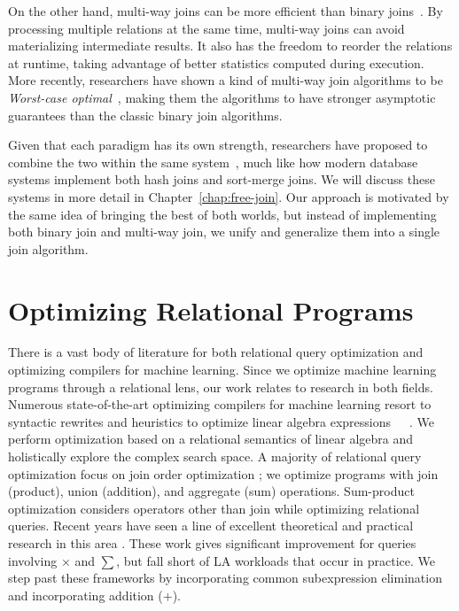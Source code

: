 On the other hand, multi-way joins can be more efficient than binary joins~\cite{DBLP:conf/vldb/GraefeBC98, DBLP:conf/vldb/KemperKW99, DBLP:conf/sigmod/HellersteinA00}.
By processing multiple relations at the same time, 
 multi-way joins can avoid materializing intermediate results. 
It also has the freedom to reorder the relations at runtime,
 taking advantage of better statistics computed during execution.
More recently, researchers have shown a kind of multi-way join algorithms to be 
 {\em Worst-case optimal}~\cite{DBLP:conf/pods/NgoPRR12, DBLP:conf/icdt/Veldhuizen14,
  DBLP:journals/sigmod/NgoRR13, DBLP:conf/pods/000118},
 making them the algorithms to have stronger asymptotic guarantees than the classic binary join algorithms.

Given that each paradigm has its own strength, 
 researchers have proposed to combine the two within the same 
 system~\cite{DBLP:journals/pvldb/FreitagBSKN20,DBLP:journals/tods/AbergerLTNOR17, DBLP:journals/pvldb/MhedhbiS19}, 
 much like how modern database systems implement both hash joins and sort-merge joins.
We will discuss these systems in more detail in Chapter~\ref{chap:free-join}.
Our approach is motivated by the same idea of bringing the best of both worlds, 
 but instead of implementing both binary join and multi-way join,
 we unify and generalize them into a single join algorithm.

\section{Optimizing Relational Programs}
\label{sec:related:linear-algebra}

There is a vast body of literature for both relational query optimization and
optimizing compilers for machine learning. Since we optimize machine learning programs through a
relational lens, our work relates to research in both fields. 
Numerous state-of-the-art optimizing compilers for machine learning
 resort to syntactic rewrites and heuristics to optimize linear algebra
expressions~\cite{DBLP:reference/bdt/Boehm19}~\cite{DBLP:conf/icml/SujeethLBRCWAOO11}~\cite{DBLP:conf/sigmod/HuangB013}. 
We perform optimization based on a
relational semantics of linear algebra and holistically explore the complex
search space. A majority of relational query optimization focus on join order
optimization \cite{Graefe95a} \cite{MoerkotteN06} \cite{MoerkotteN08}
\cite{selinger1979access}; 
we optimize programs with
join (product), union (addition), and aggregate (sum) operations. Sum-product optimization considers operators other than join while optimizing
relational queries. Recent years have seen a line of excellent theoretical and
practical research in this area \cite{KhamisNR16} \cite{Joglekar2016AJARAA}.
These work gives significant improvement for queries involving $\times$ and $\sum$,
but fall short of LA workloads that occur in practice. We step past these
frameworks by incorporating common subexpression elimination and incorporating addition
($+$). 

